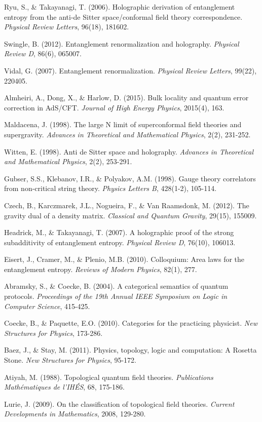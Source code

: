 \documentclass[12pt]{article}
\begin{document}
\begin{thebibliography}{99}

Ryu, S., \& Takayanagi, T. (2006). Holographic derivation of entanglement entropy from the anti-de Sitter space/conformal field theory correspondence. \emph{Physical Review Letters}, 96(18), 181602.

Swingle, B. (2012). Entanglement renormalization and holography. \emph{Physical Review D}, 86(6), 065007.

Vidal, G. (2007). Entanglement renormalization. \emph{Physical Review Letters}, 99(22), 220405.

Almheiri, A., Dong, X., \& Harlow, D. (2015). Bulk locality and quantum error correction in AdS/CFT. \emph{Journal of High Energy Physics}, 2015(4), 163.

Maldacena, J. (1998). The large N limit of superconformal field theories and supergravity. \emph{Advances in Theoretical and Mathematical Physics}, 2(2), 231-252.

Witten, E. (1998). Anti de Sitter space and holography. \emph{Advances in Theoretical and Mathematical Physics}, 2(2), 253-291.

Gubser, S.S., Klebanov, I.R., \& Polyakov, A.M. (1998). Gauge theory correlators from non-critical string theory. \emph{Physics Letters B}, 428(1-2), 105-114.

Czech, B., Karczmarek, J.L., Nogueira, F., \& Van Raamsdonk, M. (2012). The gravity dual of a density matrix. \emph{Classical and Quantum Gravity}, 29(15), 155009.

Headrick, M., \& Takayanagi, T. (2007). A holographic proof of the strong subadditivity of entanglement entropy. \emph{Physical Review D}, 76(10), 106013.

Eisert, J., Cramer, M., \& Plenio, M.B. (2010). Colloquium: Area laws for the entanglement entropy. \emph{Reviews of Modern Physics}, 82(1), 277.

Abramsky, S., \& Coecke, B. (2004). A categorical semantics of quantum protocols. \emph{Proceedings of the 19th Annual IEEE Symposium on Logic in Computer Science}, 415-425.

Coecke, B., \& Paquette, E.O. (2010). Categories for the practicing physicist. \emph{New Structures for Physics}, 173-286.

Baez, J., \& Stay, M. (2011). Physics, topology, logic and computation: A Rosetta Stone. \emph{New Structures for Physics}, 95-172.

Atiyah, M. (1988). Topological quantum field theories. \emph{Publications Mathématiques de l'IHÉS}, 68, 175-186.

Lurie, J. (2009). On the classification of topological field theories. \emph{Current Developments in Mathematics}, 2008, 129-280.

\end{thebibliography}
\end{document}
